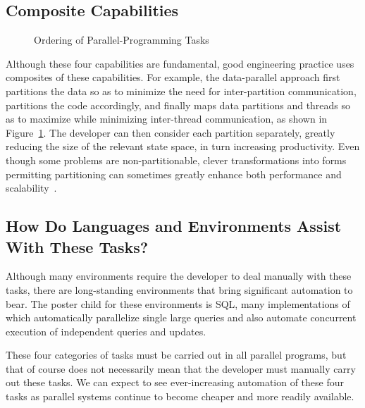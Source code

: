 \subsection{Composite Capabilities}
\label{sec:Composite Capabilities}

\begin{figure}
\centering
{}
\caption{Ordering of Parallel-Programming Tasks}
\label{fig:intro:Ordering of Parallel-Programming Tasks}
\end{figure}

Although these four capabilities are fundamental,
good engineering practice uses composites of
these capabilities.
For example, the data-parallel approach first
partitions the data so as to minimize the need for
inter-partition communication, partitions the code accordingly,
and finally maps data partitions and threads so as to maximize
 while minimizing inter-thread communication,
as shown in
Figure~\ref{fig:intro:Ordering of Parallel-Programming Tasks}.
The developer can then
consider each partition separately, greatly reducing the size
of the relevant state space, in turn increasing productivity.
Even though some problems are non-partitionable,
clever transformations into forms permitting partitioning can
sometimes greatly enhance
both performance and scalability~\cite{PanagiotisMetaxas1999PDCS}.

\subsection{How Do Languages and Environments Assist With These Tasks?}
\label{sec:intro:How Do Languages and Environments Assist With These Tasks?}

Although many environments require the developer to deal manually
with these tasks, there are long-standing environments that bring
significant automation to bear.
The poster child for these environments is SQL, many implementations
of which automatically parallelize single large queries and also
automate concurrent execution of independent queries and updates.

These four categories of tasks must be carried out in all parallel
programs, but that of course does not necessarily mean that the developer
must manually carry out these tasks.
We can expect to see ever-increasing automation of these four tasks
as parallel systems continue to become cheaper and more readily available.

